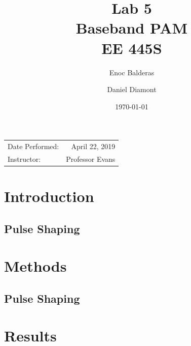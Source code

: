 \documentclass{article}
\title{Lab 5\\ Baseband PAM\\ EE 445S} %
\author{Enoc Balderas\\
        \and
        Daniel Diamont\\} %
\date{\today} %
\begin{document}
\maketitle %

\begin{center}
\begin{tabular}{l r}
Date Performed: & April 22, 2019 \\ %
Instructor: & Professor Evans %
\end{tabular}
\end{center}



\section{Introduction}

\subsection{Pulse Shaping}


\section{Methods}

\subsection{Pulse Shaping}


\pagebreak
\section{Results}
\end{document}
